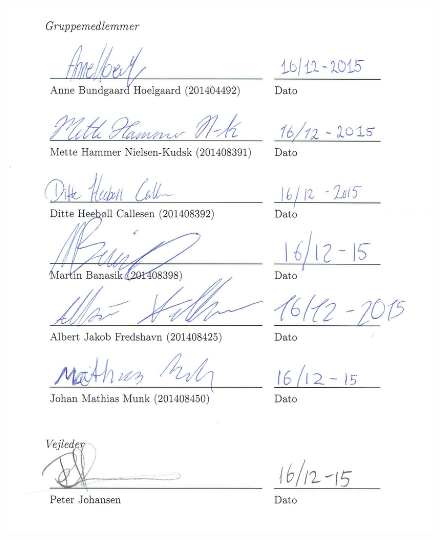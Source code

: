 \begin{figure}[H]
	\centering
	\includegraphics[width=1.\textwidth]{Figurer/underskifterRapport}
\end{figure}
